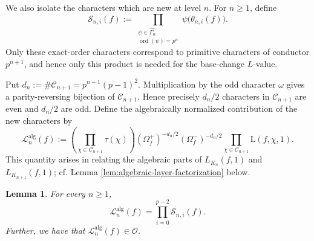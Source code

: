 \documentclass[11pt,table]{amsart}
\newtheorem{lemma}[theorem]{Lemma}
\numberwithin{equation}{section}
\begin{document}
\par We also isolate the characters which are new at level \(n\).  For
\(n\geq1\), define
\begin{equation}
\label{eq:def-Sni}
        \mathcal S_{n,i}(f)
        :=
        \prod_{\substack{\psi\in\widehat{\Gamma_n}\\
                         \operatorname{ord}(\psi)=p^n}}
        \psi\bigl(\theta_{n,i}(f)\bigr).
\end{equation}
Only these exact-order characters correspond to primitive characters
of conductor \(p^{n+1}\), and hence only this product is needed for
the base-change \(L\)-value.
\par Put $d_n
        :=
        \#\mathcal C_{n+1}
        =
        p^{n-1}(p-1)^2$. Multiplication by the odd character \(\omega\) gives a
parity-reversing bijection of \(\mathcal C_{n+1}\).  Hence precisely
\(d_n/2\) characters in \(\mathcal C_{n+1}\) are even and \(d_n/2\)
are odd. Define the algebraically normalized contribution of the new
characters by
\begin{equation}
\label{eq:def-new-layer-algebraic}
        \mathscr L_n^{\operatorname{alg}}(f)
        :=
        \left(
        \prod_{\chi\in\mathcal C_{n+1}}
        \tau(\chi)
        \right)
        (\Omega_f^+)^{-d_n/2}
        (\Omega_f^-)^{-d_n/2}
        \prod_{\chi\in\mathcal C_{n+1}}
        \mathrm{L}(f,\chi,1).
\end{equation}
This quantity arises in relating the algebraic parts of $L_{K_n}(f,1)$ and $L_{K_{n+1}}(f,1)$; cf. Lemma \ref{lem:algebraic-layer-factorization} below.
\begin{lemma}
\label{lem:primitive-layer-identification}
For every \(n\geq1\),
\begin{equation}
\label{eq:primitive-layer-identification}
        \mathscr L_n^{\operatorname{alg}}(f)
        =
        \prod_{i=0}^{p-2}\mathcal S_{n,i}(f).
\end{equation}
Further, we have that $\mathscr L_n^{\operatorname{alg}}(f)\in\mathcal O$.
\end{lemma}
\end{document}
